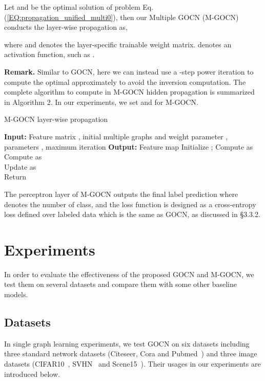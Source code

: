 \documentclass{article}
\begin{document}
Let  and  be the optimal solution of problem Eq.(\ref{EQ:propagation_unified_multi0}), then our Multiple GOCN (M-GOCN) conducts the layer-wise propagation as,

where  and  denotes the layer-specific trainable weight matrix.
 denotes an activation function, such as .


\noindent \textbf{Remark.} Similar to GOCN, here we can instead use a -step power iteration to compute the optimal  approximately to avoid the inversion computation.
The complete algorithm to compute  in M-GOCN hidden propagation is summarized in Algorithm 2. In our experiments, we set  and  for M-GOCN. 
\begin{algorithm}[h]
\caption{M-GOCN layer-wise propagation}
\begin{algorithmic}[1]
\STATE \textbf{Input:} Feature matrix , initial multiple graphs  and weight parameter , parameters ,  maximum iteration 
\STATE \textbf{Output:} Feature map 
\STATE Initialize ; 
\FOR {}
\STATE Compute  as\\

\STATE Compute  as\\

\STATE Update  as\\

\ENDFOR \label{code:recentEnd}
\STATE Return

\emph{}
\end{algorithmic}
\end{algorithm}
The perceptron layer of M-GOCN  outputs the final label prediction  where  denotes the number of class, and the loss function is designed as a cross-entropy loss defined over labeled data which is the same as GOCN, as discussed in \S 3.3.2. 


\section{Experiments}

In order to evaluate the effectiveness of the proposed GOCN and M-GOCN, we test them on several datasets and compare them with some other baseline models. 
\subsection{Datasets}

In single graph learning experiments, we test GOCN on six datasets including three standard network datasets (Citeseer, Cora and Pubmed~\cite{sen2008collective}) and three image datasets (CIFAR10~\cite{krizhevsky2009learning}, SVHN~\cite{netzer2011reading} and Scene15~\cite{jiang2013label}). Their usages in our experiments are introduced below.
\end{document}
